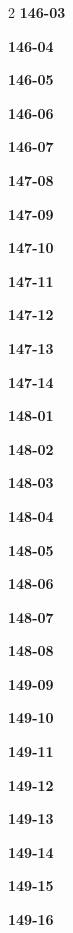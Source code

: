 \documentclass[10pt,a4paper]{article}
\begin{document}
\begin{multicols}{2}
\noindent\textbf{146-03}\ \par
\noindent\textbf{146-04}\ \par
\noindent\textbf{146-05}\ \par
\noindent\textbf{146-06}\ \par
\noindent\textbf{146-07}\ \par
\noindent\textbf{147-08}\ \par
\noindent\textbf{147-09}\ \par
\noindent\textbf{147-10}\ \par
\noindent\textbf{147-11}\ \par
\noindent\textbf{147-12}\ \par
\noindent\textbf{147-13}\ \par
\noindent\textbf{147-14}\ \par
\noindent\textbf{148-01}\ \par
\noindent\textbf{148-02}\ \par
\noindent\textbf{148-03}\ \par
\noindent\textbf{148-04}\ \par
\noindent\textbf{148-05}\ \par
\noindent\textbf{148-06}\ \par
\noindent\textbf{148-07}\ \par
\noindent\textbf{148-08}\ \par
\noindent\textbf{149-09}\ \par
\noindent\textbf{149-10}\ \par
\noindent\textbf{149-11}\ \par
\noindent\textbf{149-12}\ \par
\noindent\textbf{149-13}\ \par
\noindent\textbf{149-14}\ \par
\noindent\textbf{149-15}\ \par
\noindent\textbf{149-16}\ \par
\end{multicols}
\end{document}
